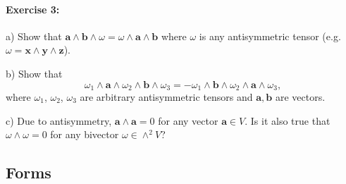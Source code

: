 \paragraph{Exercise 3:}

a) Show that $\mathbf{a}\wedge\mathbf{b}\wedge\omega=\omega\wedge\mathbf{a}\wedge\mathbf{b}$
where $\omega$ is any antisymmetric tensor (e.g.~$\omega=\mathbf{x}\wedge\mathbf{y}\wedge\mathbf{z}$).

b) Show that\[
\omega_{1}\wedge\mathbf{a}\wedge\omega_{2}\wedge\mathbf{b}\wedge\omega_{3}=-\omega_{1}\wedge\mathbf{b}\wedge\omega_{2}\wedge\mathbf{a}\wedge\omega_{3},\]
where $\omega_{1}$, $\omega_{2}$, $\omega_{3}$ are arbitrary antisymmetric
tensors and $\mathbf{a},\mathbf{b}$ are vectors. 

c) Due to antisymmetry,  $\mathbf{a}\wedge\mathbf{a}=0$ for any vector
$\mathbf{a}\in V$. Is it also true that $\omega\wedge\omega=0$ for
any bivector $\omega\in\wedge^{2}V$?



\subsection{Forms}

